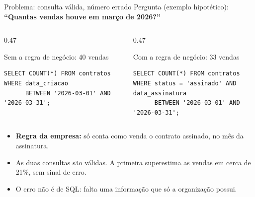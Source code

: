 \documentclass[aspectratio=169,10pt]{beamer}
\begin{document}
\begin{frame}[fragile]{Problema: consulta válida, número errado}
  Pergunta (exemplo hipotético): \textbf{``Quantas vendas houve em março de 2026?''}
  \vspace{1mm}
  \begin{columns}[T,onlytextwidth]
    \begin{column}{0.47\textwidth}
      \begin{alertblock}{Sem a regra de negócio: 40 vendas}
\begin{lstlisting}
SELECT COUNT(*) FROM contratos
WHERE data_criacao
      BETWEEN '2026-03-01' AND '2026-03-31';
\end{lstlisting}
      \end{alertblock}
    \end{column}
    \begin{column}{0.47\textwidth}
      \begin{exampleblock}{Com a regra de negócio: 33 vendas}
\begin{lstlisting}
SELECT COUNT(*) FROM contratos
WHERE status = 'assinado' AND data_assinatura
      BETWEEN '2026-03-01' AND '2026-03-31';
\end{lstlisting}
      \end{exampleblock}
    \end{column}
  \end{columns}
  \vspace{2mm}
  \begin{itemize}
    \item \textbf{Regra da empresa:} só conta como venda o contrato assinado, no mês da assinatura.
    \item As duas consultas são válidas. A primeira superestima as vendas em cerca de 21\%, sem sinal de erro.
    \item O erro não é de SQL: falta uma informação que só a organização possui.
  \end{itemize}
\end{frame}
\end{document}
